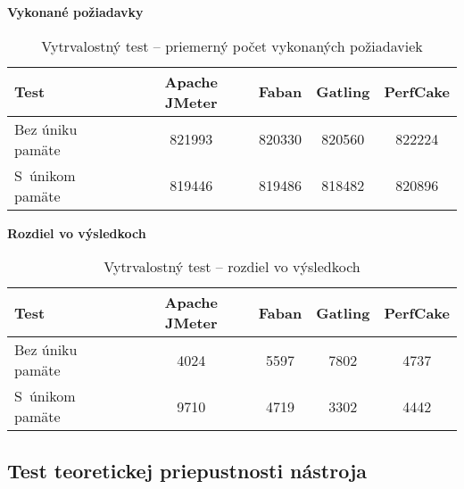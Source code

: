 \documentclass[12pt,oneside,final]{fithesis-utf8}
\begin{document}
\begin{itemize}
\textbf{Vykonané požiadavky}

\begin{table}[H]
\begin{center}
\begin{tabular}{ | l | c | c | c | c |}
		\hline
		 \textbf{Test} & \textbf{Apache JMeter} & \textbf{Faban} & \textbf{Gatling} & \textbf{PerfCake} \\ \hline
		 Bez úniku pamäte & 821993 & 820330 & 820560 & 822224 \\ \hline
 		 S~únikom pamäte & 819446 & 819486 & 818482 & 820896 \\ \hline
		 
\end{tabular}
\end{center}
\caption{Vytrvalostný test -- priemerný počet vykonaných požiadaviek}
\end{table}


\textbf{Rozdiel vo výsledkoch}

\begin{table}[H]
\begin{center}
\begin{tabular}{ | l | c | c | c | c |}
		\hline
		 \textbf{Test} & \textbf{Apache JMeter} & \textbf{Faban} & \textbf{Gatling} & \textbf{PerfCake} \\ \hline
		 Bez úniku pamäte & 4024 & 5597 & 7802 & 4737 \\ \hline
 		 S~únikom pamäte & 9710 & 4719 & 3302 & 4442 \\ \hline
		 
\end{tabular}
\end{center}
\caption{Vytrvalostný test -- rozdiel vo výsledkoch}
\end{table}

\end{itemize}

\newpage
\subsection{Test teoretickej priepustnosti nástroja}
\end{document}
